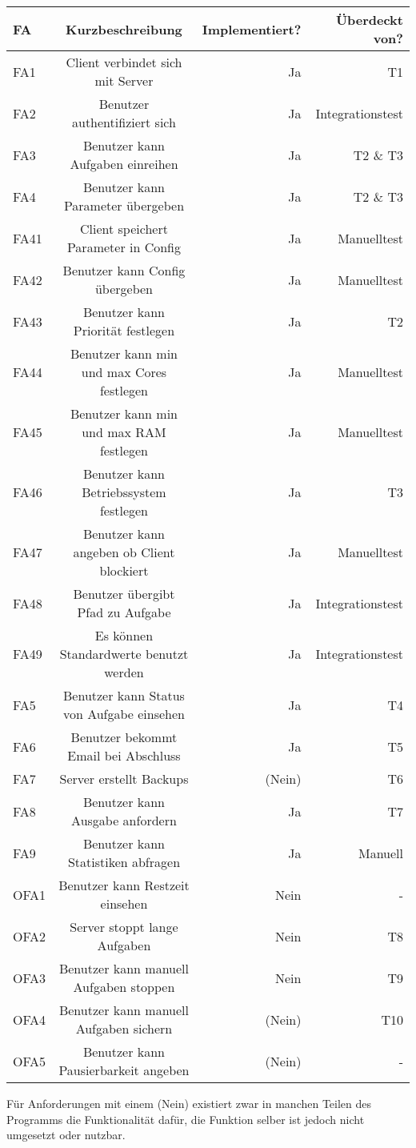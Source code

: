 \documentclass[a4paper,12pt]{article}
\begin{document}
\begin{tabular}{|l|c|r|r|}
	\hline
	FA & Kurzbeschreibung & Implementiert? & Überdeckt von? \\ \hline \hline
	FA1 & Client verbindet sich mit Server & Ja & T1\\ \hline
	FA2 & Benutzer authentifiziert sich & Ja & Integrationstest\\ \hline
	FA3 & Benutzer kann Aufgaben einreihen & Ja & T2 \& T3\\ \hline
	FA4 & Benutzer kann Parameter übergeben & Ja & T2 \& T3\\ \hline
	FA41 & Client speichert Parameter in Config & Ja & Manuelltest\\ \hline
	FA42 & Benutzer kann Config übergeben & Ja & Manuelltest\\ \hline
	FA43 & Benutzer kann Priorität festlegen & Ja & T2\\ \hline
	FA44 & Benutzer kann min und max Cores festlegen & Ja & Manuelltest\\ \hline
	FA45 & Benutzer kann min und max RAM festlegen & Ja & Manuelltest\\ \hline
	FA46 & Benutzer kann Betriebssystem festlegen & Ja & T3\\ \hline
	FA47 & Benutzer kann angeben ob Client blockiert & Ja & Manuelltest\\ \hline
	FA48 & Benutzer übergibt Pfad zu Aufgabe & Ja & Integrationstest\\ \hline
	FA49 & Es können Standardwerte benutzt werden & Ja & Integrationstest\\ \hline
	FA5 & Benutzer kann Status von Aufgabe einsehen & Ja & T4\\ \hline
	FA6 & Benutzer bekommt Email bei Abschluss & Ja & T5 \\ \hline
	FA7 & Server erstellt Backups & (Nein) & T6 \\ \hline
	FA8 & Benutzer kann Ausgabe anfordern & Ja & T7\\ \hline
	FA9 & Benutzer kann Statistiken abfragen & Ja & Manuell\\ \hline \hline
	OFA1 & Benutzer kann Restzeit einsehen & Nein & - \\ \hline
	OFA2 & Server stoppt lange Aufgaben & Nein & T8 \\ \hline
	OFA3 & Benutzer kann manuell Aufgaben stoppen & Nein & T9 \\ \hline
	OFA4 & Benutzer kann manuell Aufgaben sichern & (Nein) & T10 \\ \hline
	OFA5 & Benutzer kann Pausierbarkeit angeben & (Nein) & - \\ \hline
\end{tabular}
\newline \newline
Für Anforderungen mit einem (Nein) existiert zwar in manchen Teilen des Programms die Funktionalität dafür, die Funktion selber ist jedoch nicht umgesetzt oder nutzbar.
\clearpage
\end{document}
